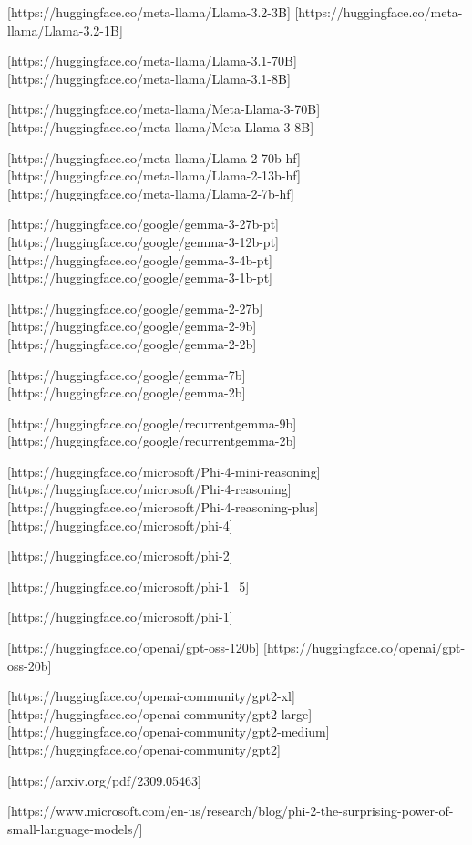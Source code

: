         [https://huggingface.co/meta-llama/Llama-3.2-3B]
        [https://huggingface.co/meta-llama/Llama-3.2-1B]

        [https://huggingface.co/meta-llama/Llama-3.1-70B]
        [https://huggingface.co/meta-llama/Llama-3.1-8B]

        [https://huggingface.co/meta-llama/Meta-Llama-3-70B]
        [https://huggingface.co/meta-llama/Meta-Llama-3-8B]

        [https://huggingface.co/meta-llama/Llama-2-70b-hf]
        [https://huggingface.co/meta-llama/Llama-2-13b-hf]
        [https://huggingface.co/meta-llama/Llama-2-7b-hf]


        [https://huggingface.co/google/gemma-3-27b-pt]
        [https://huggingface.co/google/gemma-3-12b-pt]
        [https://huggingface.co/google/gemma-3-4b-pt]
        [https://huggingface.co/google/gemma-3-1b-pt]

        [https://huggingface.co/google/gemma-2-27b]
        [https://huggingface.co/google/gemma-2-9b]
        [https://huggingface.co/google/gemma-2-2b]

        [https://huggingface.co/google/gemma-7b]
        [https://huggingface.co/google/gemma-2b]

        [https://huggingface.co/google/recurrentgemma-9b]
        [https://huggingface.co/google/recurrentgemma-2b]


        [https://huggingface.co/microsoft/Phi-4-mini-reasoning]
        [https://huggingface.co/microsoft/Phi-4-reasoning]
        [https://huggingface.co/microsoft/Phi-4-reasoning-plus]
        [https://huggingface.co/microsoft/phi-4]

        [https://huggingface.co/microsoft/phi-2]

        [\url{https://huggingface.co/microsoft/phi-1_5}]

        [https://huggingface.co/microsoft/phi-1]


        [https://huggingface.co/openai/gpt-oss-120b]
        [https://huggingface.co/openai/gpt-oss-20b]

        [https://huggingface.co/openai-community/gpt2-xl]
        [https://huggingface.co/openai-community/gpt2-large]
        [https://huggingface.co/openai-community/gpt2-medium]
        [https://huggingface.co/openai-community/gpt2]


        [https://arxiv.org/pdf/2309.05463]

        [https://www.microsoft.com/en-us/research/blog/phi-2-the-surprising-power-of-small-language-models/]

